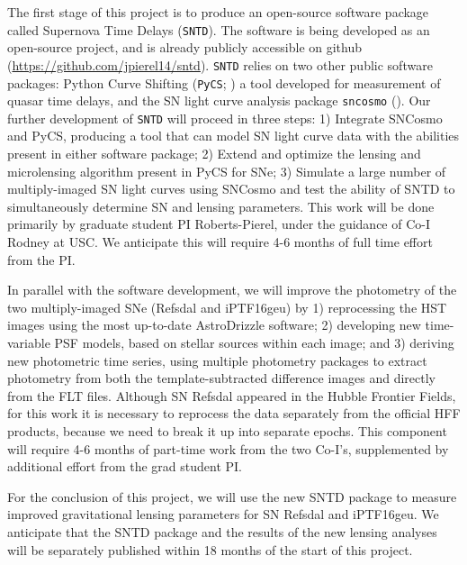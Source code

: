 The first stage of this project is to produce an open-source software
package called Supernova Time Delays ({\tt SNTD}). The software is being
developed as an open-source project, and is already publicly
accessible on github (\url{https://github.com/jpierel14/sntd}).  {\tt SNTD}
relies on two other public software packages: Python Curve Shifting
({\tt PyCS}; \citealt{Tewes:2013a}) a tool developed for measurement of
quasar time delays, and the SN light curve analysis package {\tt sncosmo}
(\citep{Barbary:2014}). Our further development of {\tt SNTD} will proceed in three steps: 1)
Integrate SNCosmo and PyCS, producing a tool that can model
SN light curve data with the abilities present in either software
package; 2) Extend and optimize the lensing and microlensing algorithm
present in PyCS for SNe; 3) Simulate a large number of multiply-imaged
SN light curves using SNCosmo and test the ability of SNTD to
simultaneously determine SN and lensing parameters. This work will be
done primarily by graduate student PI Roberts-Pierel, under the
guidance of Co-I Rodney at USC.  We anticipate this will require 4-6
months of full time effort from the PI.

In parallel with the software development, we will improve the
photometry of the two multiply-imaged SNe (Refsdal and iPTF16geu) by
1) reprocessing the HST images using the most up-to-date AstroDrizzle
software; 2) developing new time-variable PSF models, based on stellar
sources within each image; and 3) deriving new photometric time
series, using multiple photometry packages to extract photometry from
both the template-subtracted difference images and directly from the
FLT files. Although SN Refsdal appeared in the Hubble Frontier Fields,
for this work it is necessary to reprocess the data separately from
the official HFF products, because we need to break it up into
separate epochs.  This component will require 4-6 months of part-time
work from the two Co-I's, supplemented by additional effort from the
grad student PI.

For the conclusion of this project, we will use the new SNTD package
to measure improved gravitational lensing parameters for SN Refsdal
and iPTF16geu.   We anticipate that the
SNTD package and the results of the new lensing analyses will be
separately published within 18 months of the start of this project.
